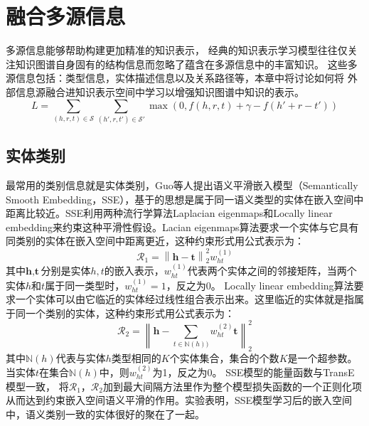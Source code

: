 \documentclass[twocolumn]{article}
\author{\zihao{-4} \songti xxx}
\date{}
\newcommand{\upcite}[1]{\textsuperscript{\textsuperscript{\cite{#1}}}}
\begin{document}
	\section{融合多源信息}
	多源信息能够帮助构建更加精准的知识表示，
	经典的知识表示学习模型往往仅关注知识图谱自身固有的结构信息而忽略了蕴含在多源信息中的丰富知识。
	这些多源信息包括：类型信息，实体描述信息以及关系路径等，本章中将讨论如何将
	外部信息源融合进知识表示空间中学习以增强知识图谱中知识的表示。
	\begin{equation}
		L=\sum_{(h,r,t)\in \mathcal{S}}\sum_{(h',r,t')\in \mathcal{S}'}\max (0,f(h,r,t)+\gamma-f(h'+r-t'))
	\end{equation}
	\subsection{实体类别}
	最常用的类别信息就是实体类别，Guo等人\upcite{SSE}提出语义平滑嵌入模型（Semantically Smooth Embedding，SSE），基于的思想是属于同一语义类型的实体在嵌入空间中距离比较近。SSE利用两种流行学算法Laplacian eigenmaps和Locally linear embedding来约束这种平滑性假设。Lacian eigenmaps算法要求一个实体与它具有同类别的实体在嵌入空间中距离更近，这种约束形式用公式表示为：
	\begin{equation}
		\mathcal{R}_1 =\left \| \textbf{h}-\textbf{t} \right \|_2^2w_{ht}^{(1)}
	\end{equation}
	其中$\textbf{h},\textbf{t}$分别是实体$h,t$的嵌入表示，$w_{ht}^{(1)}$代表两个实体之间的邻接矩阵，当两个实体$h$和$t$属于同一类型时，$w_{ht}^{(1)}=1$，反之为0。
	Locally linear embedding算法要求一个实体可以由它临近的实体经过线性组合表示出来。这里临近的实体就是指属于同一个类别的实体，这种约束形式用公式表示为：
	\begin{equation}
	\mathcal{R}_2=\left \| \textbf{h}-\sum _{t\in \mathbb{N}(h))}w_{ht}^{(2)}\textbf{t} \right \|_2^2
	\end{equation}
	其中$\mathbb{N}(h)$代表与实体$h$类型相同的$K$个实体集合，集合的个数$K$是一个超参数。
	当实体$t$在集合$\mathbb{N}(h)$中，则$w_{ht}^{(2)}$为1，反之为0。
	SSE模型的能量函数与TransE\upcite{TransE}模型一致，
	将$\mathcal{R}_1$，$\mathcal{R}_2$加到最大间隔方法里作为整个模型损失函数的一个正则化项从而达到约束嵌入空间语义平滑的作用。实验表明，SSE模型学习后的嵌入空间中，语义类别一致的实体很好的聚在了一起。
	
\end{document}
